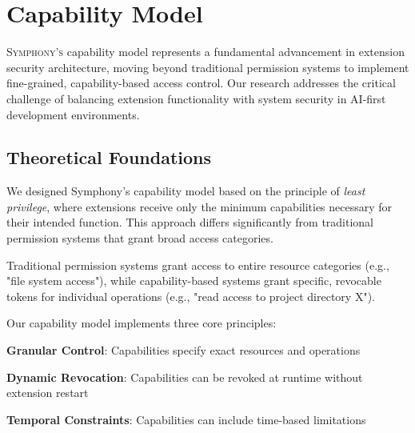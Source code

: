 
\section*{Capability Model}

\vspace{0.5cm}
\lettrine{S}{ymphony's} capability model represents a fundamental advancement in extension security architecture, moving beyond traditional permission systems to implement fine-grained, capability-based access control. Our research addresses the critical challenge of balancing extension functionality with system security in AI-first development environments.

\subsection*{Theoretical Foundations}

We designed Symphony's capability model based on the principle of \textit{least privilege}, where extensions receive only the minimum capabilities necessary for their intended function. This approach differs significantly from traditional permission systems that grant broad access categories.

\begin{infobox}[title=Capability vs Permission Paradigms]
Traditional permission systems grant access to entire resource categories (e.g., "file system access"), while capability-based systems grant specific, revocable tokens for individual operations (e.g., "read access to project directory X").
\end{infobox}

Our capability model implements three core principles:

\begin{compactlist}
    \item \textbf{Granular Control}: Capabilities specify exact resources and operations
    \item \textbf{Dynamic Revocation}: Capabilities can be revoked at runtime without extension restart
    \item \textbf{Temporal Constraints}: Capabilities can include time-based limitations
\end{compactlist}

